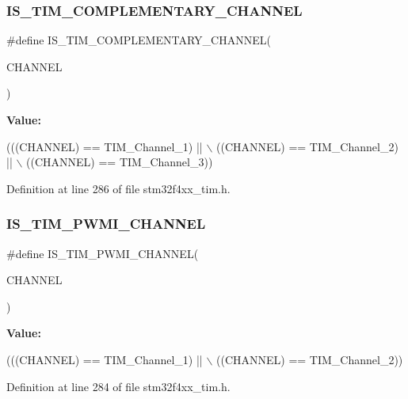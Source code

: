\subsubsection{\texorpdfstring{I\+S\+\_\+\+T\+I\+M\+\_\+\+C\+O\+M\+P\+L\+E\+M\+E\+N\+T\+A\+R\+Y\+\_\+\+C\+H\+A\+N\+N\+EL}{IS\_TIM\_COMPLEMENTARY\_CHANNEL}}
{\footnotesize\ttfamily \#define I\+S\+\_\+\+T\+I\+M\+\_\+\+C\+O\+M\+P\+L\+E\+M\+E\+N\+T\+A\+R\+Y\+\_\+\+C\+H\+A\+N\+N\+EL(\begin{DoxyParamCaption}\item[{}]{C\+H\+A\+N\+N\+EL }\end{DoxyParamCaption})}

{\bfseries Value\+:}
\begin{DoxyCode}
(((CHANNEL) == TIM\_Channel\_1) || \(\backslash\)
                                               ((CHANNEL) == TIM\_Channel\_2) || \(\backslash\)
                                               ((CHANNEL) == TIM\_Channel\_3))
\end{DoxyCode}


Definition at line 286 of file stm32f4xx\+\_\+tim.\+h.

\mbox{\label{group___t_i_m___channel_gacbf272b7a14f63b38bdbf18577835dce}} 
\subsubsection{\texorpdfstring{I\+S\+\_\+\+T\+I\+M\+\_\+\+P\+W\+M\+I\+\_\+\+C\+H\+A\+N\+N\+EL}{IS\_TIM\_PWMI\_CHANNEL}}
{\footnotesize\ttfamily \#define I\+S\+\_\+\+T\+I\+M\+\_\+\+P\+W\+M\+I\+\_\+\+C\+H\+A\+N\+N\+EL(\begin{DoxyParamCaption}\item[{}]{C\+H\+A\+N\+N\+EL }\end{DoxyParamCaption})}

{\bfseries Value\+:}
\begin{DoxyCode}
(((CHANNEL) == TIM\_Channel\_1) || \(\backslash\)
                                      ((CHANNEL) == TIM\_Channel\_2))
\end{DoxyCode}


Definition at line 284 of file stm32f4xx\+\_\+tim.\+h.

